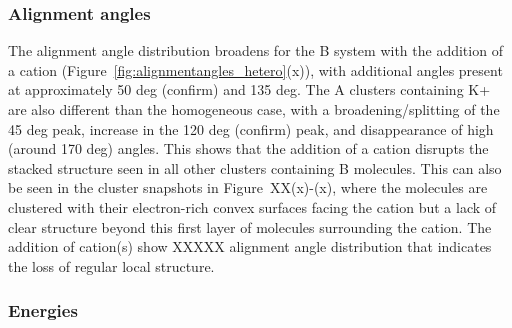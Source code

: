 \subsubsection{Alignment angles}
The alignment angle distribution broadens for the B system with the addition of a cation (Figure~\ref{fig:alignmentangles_hetero}(x)), with additional angles present at approximately 50 deg (confirm) and 135 deg.
The A clusters containing K+ are also different than the homogeneous case, with a broadening/splitting of the 45 deg peak, increase in the 120 deg (confirm) peak, and disappearance of high (around 170 deg) angles. This shows that the addition of a cation disrupts the stacked structure seen in all other clusters containing B molecules. This can also be seen in the cluster snapshots in Figure~XX(x)-(x), where the molecules are clustered with their electron-rich convex surfaces facing the cation but a lack of clear structure beyond this first layer of molecules surrounding the cation.
The addition of cation(s) show XXXXX alignment angle distribution that indicates the loss of regular local structure.


\subsubsection{Energies}

